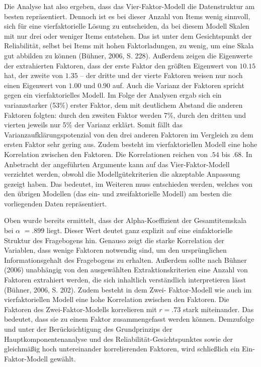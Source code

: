 \documentclass[12pt,a4paper]{article}
\begin{document}
Die Analyse hat also ergeben, dass das Vier-Faktor-Modell die Datenstruktur am besten repräsentiert. Dennoch ist es bei dieser Anzahl von Items wenig sinnvoll, sich für eine vierfaktorielle Lösung zu entscheiden, da bei diesem Modell Skalen mit nur drei oder weniger Items entstehen. Das ist unter dem Gesichtspunkt der Reliabilität, selbst bei Items mit hohen Faktorladungen, zu wenig, um eine Skala gut abbilden zu können (Bühner, 2006, S. 228). Außerdem zeigen die Eigenwerte der extrahierten Faktoren, dass der erste Faktor den größten Eigenwert von $10.15$ hat, der zweite von $1.35$ –  der dritte und der vierte Faktoren weisen nur noch einen Eigenwert von $1.00$ und $0.90$ auf. Auch die Varianz der Faktoren spricht gegen ein vierfaktorielles Modell. Im Folge der Analysen ergab sich ein varianzstarker (53\%) erster Faktor, dem mit deutlichem Abstand die anderen Faktoren folgten: durch den zweiten Faktor werden 7\%, durch den dritten und vierten jeweils nur 5\% der Varianz erklärt. Somit fällt das Varianzaufklärungspotenzial von den drei anderen Faktoren im Vergleich zu dem ersten Faktor sehr gering aus. Zudem besteht im vierfaktoriellen Modell eine hohe Korrelation zwischen den Faktoren.  Die Korrelationen reichen von $.54$ bis $.68$. In Anbetracht der angeführten Argumente kann auf das Vier-Faktor-Modell verzichtet werden, obwohl die Modellgütekriterien die akzeptable Anpassung gezeigt haben. Das bedeutet, im Weiteren muss entschieden werden, welches von den übrigen Modellen (das ein- und zweifaktorielle Modell) am besten die vorliegenden Daten repräsentiert.

	Oben wurde bereits ermittelt, dass der Alpha-Koeffizient der Gesamtitemskala bei $\alpha$ $= .899$ liegt. Dieser Wert deutet ganz explizit auf eine einfaktorielle Struktur des Fragebogens hin. Genauso zeigt die starke Korrelation der Variablen, dass wenige Faktoren notwendig sind, um den ursprünglichen Informationsgehalt des Fragebogens zu erhalten. Außerdem sollte nach Bühner (2006) unabhängig von den ausgewählten Extraktionskriterien eine Anzahl von Faktoren extrahiert werden, die sich inhaltlich verständlich interpretieren lässt (Bühner, 2006, S. 202). Zudem besteht in dem Zwei- Faktor-Modell wie auch im vierfaktoriellen Modell eine hohe Korrelation zwischen den Faktoren. Die Faktoren des Zwei-Faktor-Modells korrelieren mit $r = .73$ stark miteinander. Das bedeutet, dass sie zu einem Faktor zusammengefasst werden können. Demzufolge und unter der Berücksichtigung des Grundprinzips der Hauptkomponentenanalyse und des Reliabilität-Gesichtspunktes sowie der gleichmäßig hoch untereinander korrelierenden Faktoren, wird schließlich ein Ein-Faktor-Modell gewählt.
\end{document}
